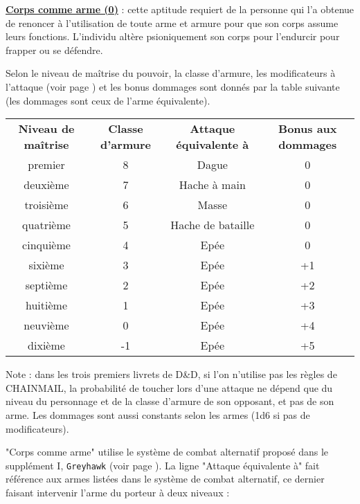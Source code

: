 \bigskip

\label{guerrier-corps-comme-arme}\textbf{\uline{Corps comme arme (0)}} : cette aptitude requiert de la personne qui l'a obtenue de renoncer à l'utilisation de toute arme et armure pour que son corps assume leurs fonctions. L'individu altère psioniquement son corps pour l'endurcir pour frapper ou se défendre.

\bigskip

Selon le niveau de maîtrise du pouvoir, la classe d'armure, les modificateurs à l'attaque (voir page \pageref{custom-combat-alternatif}) et les bonus dommages sont donnés par la table suivante (les dommages sont ceux de l'arme équivalente).

\bigskip

\begin{tabular}{cccc}
\textbf{Niveau de maîtrise} & \textbf{Classe d'armure} & \textbf{Attaque équivalente à} & \textbf{Bonus aux dommages}\\
premier     & 8  & Dague                & 0 \\
deuxième    & 7  & Hache à main         & 0 \\
troisième   & 6  & Masse                & 0 \\
quatrième   & 5  & Hache de bataille    & 0 \\
cinquième   & 4  & Epée                 & 0 \\
sixième     & 3  & Epée                 & +1 \\
septième    & 2  & Epée                 & +2 \\
huitième    & 1  & Epée                 & +3 \\
neuvième    & 0  & Epée                 & +4 \\
dixième     & -1 & Epée                 & +5 \\
\end{tabular}

\bigskip

Note : dans les trois premiers livrets de D\&D, si l'on n'utilise pas les règles de CHAINMAIL, la probabilité de toucher lors d'une attaque ne dépend que du niveau du personnage et de la classe d'armure de son opposant, et pas de son arme. Les dommages sont aussi constants selon les armes (1d6 si pas de modificateurs).

\bigskip

"Corps comme arme" utilise le système de combat alternatif proposé dans le supplément I, \texttt{Greyhawk} (voir page \pageref{custom-combat-alternatif}). La ligne "Attaque équivalente à" fait référence aux armes listées dans le système de combat alternatif, ce dernier faisant intervenir l'arme du porteur à deux niveaux :

